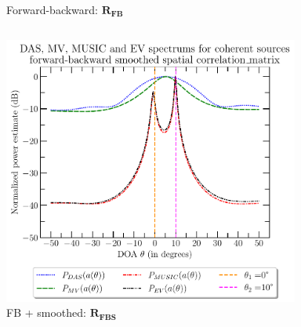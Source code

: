 \documentclass[UKenglish,8pt,aspectratio=1610]{beamer}
\begin{document}
\begin{frame}
\begin{columns}
\begin{column}{0.33\textwidth}
\begin{figure}[h!]
		\caption{Forward-backward: $\mathbf{R_{FB}}$}
	\end{figure}
\end{column}
\end{columns}
\begin{columns}
	\begin{column}{0.33\textwidth}
		\vspace{-15pt}
	\begin{figure}[h!]
		\centering
		\includegraphics[scale=0.27]{question8/spectrums/part_A_question_8_all_spectrums_forward_backward_smoothed_spatial_correlation_matrix}
		\caption{FB + smoothed: $\mathbf{R_{FBS}}$}
	\end{figure}
\end{column}
	\begin{column}{0.33\textwidth}
		\vspace{-15pt}
	\begin{figure}[h!]
		\centering

\end{figure}
\end{column}
\end{columns}
\end{frame}
\end{document}
